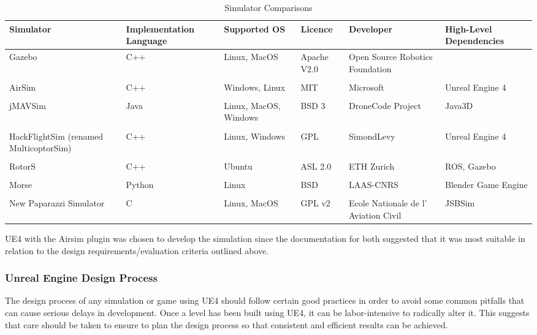 \begin{center}
\begin{table}
\footnotesize
\centering
\begin{tabular}{ p{2.1cm} p{2.2cm} p{2.1cm} p{2.1cm} p{2.1cm} p{2.1cm}} 
\hline
Simulator & Implementation Language & Supported OS & Licence & Developer & High-Level Dependencies\\
\hline
Gazebo \cite{Koenig2005DesignSimulator} & C++ & Linux, MacOS & Apache V2.0 & Open Source Robotics Foundation & \\
\\
AirSim \cite{Shah2017AirSim:Vehicles} & C++ & Windows, Linux & MIT & Microsoft & Unreal Engine 4\\ 
\\
jMAVSim \cite{jMAVSim} & Java & Linux, MacOS, Windows & BSD 3 & DroneCode Project & Java3D\\
\\
HackFlightSim (renamed MulticoptorSim) \cite{MulticopterSim} & C++ & Linux, Windows & GPL & SimondLevy & Unreal Engine 4 \\
\\
RotorS & C++ & Ubuntu & ASL 2.0 & ETH Zurich & ROS, Gazebo\\
\\
Morse & Python & Linux & BSD & LAAS-CNRS & Blender Game Engine \\
\\
New Paparazzi Simulator & C & Linux, MacOS & GPL v2 & Ecole Nationale de l’ Aviation Civil & JSBSim\\
\hline
\end{tabular}
\caption{Simulator Comparisons}
\label{table:SimulatorComparison}
\end{table}
\end{center}

UE4 with the Airsim plugin was chosen to develop the simulation since the documentation for both suggested that it was most suitable in relation to the design requirements/evaluation criteria outlined above.\par

\subsubsection{Unreal Engine Design Process}
The design process of any simulation or game using UE4 should follow certain good practices in order to avoid some common pitfalls that can cause serious delays in development. Once a level has been built using UE4, it can be labor-intensive to radically alter it\cite[p.~454]{Rouse2005GamePractice}. This suggests that care should be taken to ensure to plan the design process so that consistent and efficient results can be achieved.

